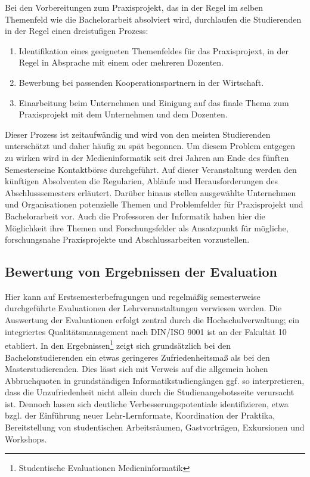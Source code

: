 Bei den Vorbereitungen zum Praxisprojekt, das in der Regel im selben
Themenfeld wie die Bachelorarbeit absolviert wird, durchlaufen die
Studierenden in der Regel einen dreistufigen Prozess:

\begin{enumerate}
\def\labelenumi{\arabic{enumi}.}
\tightlist
\item
  Identifikation eines geeigneten Themenfeldes für das Praxisprojext, in
  der Regel in Absprache mit einem oder mehreren Dozenten.
\item
  Bewerbung bei passenden Kooperationspartnern in der Wirtschaft.
\item
  Einarbeitung beim Unternehmen und Einigung auf das finale Thema zum
  Praxisprojekt mit dem Unternehmen und dem Dozenten.
\end{enumerate}

Dieser Prozess ist zeitaufwändig und wird von den meisten Studierenden
unterschätzt und daher häufig zu spät begonnen. Um diesem Problem
entgegen zu wirken wird in der Medieninformatik seit drei Jahren am Ende
des fünften Semesterseine Kontaktbörse durchgeführt. Auf dieser
Veranstaltung werden den künftigen Absolventen die Regularien, Abläufe
und Herausforderungen des Abschlusssemesters erläutert. Darüber hinaus
stellen ausgewählte Unternehmen und Organisationen potenzielle Themen
und Problemfelder für Praxisprojekt und Bachelorarbeit vor. Auch die
Professoren der Informatik haben hier die Möglichkeit ihre Themen und
Forschungsfelder als Ansatzpunkt für mögliche, forschungsnahe
Praxisprojekte und Abschlussarbeiten vorzustellen.

\subsection{Bewertung von Ergebnissen der
Evaluation}\label{bewertung-von-ergebnissen-der-evaluation}

Hier kann auf Erstsemesterbefragungen und regelmäßig semesterweise
durchgeführte Evaluationen der Lehrveranstaltungen verwiesen werden. Die
Auswertung der Evaluationen erfolgt zentral durch die
Hochschulverwaltung; ein integriertes Qualitätsmanagement nach DIN/ISO
9001 ist an der Fakultät 10 etabliert. In den Ergebnissen\footnote{Studentische
  Evaluationen Medieninformatik} zeigt sich grundsätzlich bei den
Bachelorstudierenden ein etwas geringeres Zufriedenheitsmaß als bei den
Masterstudierenden. Dies lässt sich mit Verweis auf die allgemein hohen
Abbruchquoten in grundständigen Informatikstudiengängen ggf. so
interpretieren, dass die Unzufriedenheit nicht allein durch die
Studienangebotsseite verursacht ist. Dennoch lassen sich deutliche
Verbesserungspotentiale identifizieren, etwa bzgl. der Einführung neuer
Lehr-Lernformate, Koordination der Praktika, Bereitstellung von
studentischen Arbeitsräumen, Gastvorträgen, Exkursionen und Workshops.

